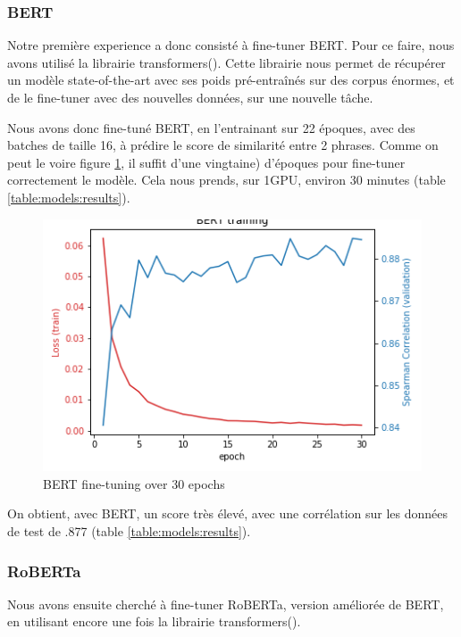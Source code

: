 \documentclass[11pt,a4paper, french]{article}
\begin{document}
\subsubsection{BERT}

Notre première experience a donc consisté à fine-tuner BERT. Pour ce faire, nous avons utilisé la librairie transformers(\cite{huggingface}). Cette librairie nous permet de récupérer un modèle state-of-the-art avec ses poids pré-entraînés sur des corpus énormes, et de le fine-tuner avec des nouvelles données, sur une nouvelle tâche.

Nous avons donc fine-tuné BERT, en l'entrainant sur 22 époques, avec des batches de taille 16, à prédire le score de similarité entre 2 phrases. Comme on peut le voire figure \ref{fig:BERT:finetunning}, il suffit d'une vingtaine) d'époques pour fine-tuner correctement le modèle. Cela nous prends, sur 1GPU, environ 30 minutes (table \ref{table:models:results}).

\begin{figure}
  \includegraphics[width=\linewidth]{resources/bert-training.png}
  \caption{BERT fine-tuning over 30 epochs}
  \label{fig:BERT:finetunning}
\end{figure}

On obtient, avec BERT, un score très élevé, avec une corrélation sur les données de test de .877 (table \ref{table:models:results}).

%
\subsubsection{RoBERTa}

Nous avons ensuite cherché à fine-tuner RoBERTa, version améliorée de BERT, en utilisant encore une fois la librairie transformers(\cite{huggingface}).
\end{document}
